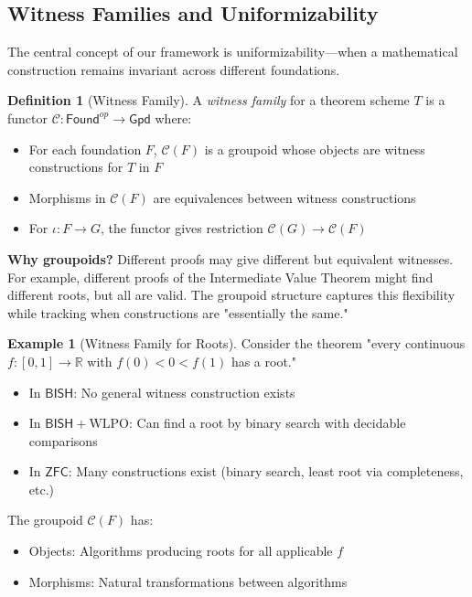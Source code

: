 \documentclass[11pt]{article}
\theoremstyle{plain}
\theoremstyle{definition}
\newtheorem{definition}[theorem]{Definition}
\newtheorem{example}[theorem]{Example}
\newcommand{\R}{\mathbb{R}}
\newcommand{\WLPO}{\mathrm{WLPO}}
\newcommand{\BISH}{\mathsf{BISH}}
\newcommand{\ZFC}{\mathsf{ZFC}}
\newcommand{\Found}{\mathsf{Found}}
\newcommand{\Gpd}{\mathsf{Gpd}}
\begin{document}
\subsection{Witness Families and Uniformizability}

The central concept of our framework is uniformizability—when a mathematical construction remains invariant across different foundations.

\begin{definition}[Witness Family]\label{def:witness-family}
A \emph{witness family} for a theorem scheme $T$ is a functor $\mathcal{C}: \Found^{op} \to \Gpd$ where:
\begin{itemize}
\item For each foundation $F$, $\mathcal{C}(F)$ is a groupoid whose objects are witness constructions for $T$ in $F$
\item Morphisms in $\mathcal{C}(F)$ are equivalences between witness constructions
\item For $\iota: F \to G$, the functor gives restriction $\mathcal{C}(G) \to \mathcal{C}(F)$
\end{itemize}
\end{definition}

\begin{intuitionbox}
\textbf{Why groupoids?} Different proofs may give different but equivalent witnesses. For example, different proofs of the Intermediate Value Theorem might find different roots, but all are valid. The groupoid structure captures this flexibility while tracking when constructions are "essentially the same."
\end{intuitionbox}

\begin{example}[Witness Family for Roots]
Consider the theorem "every continuous $f: [0,1] \to \R$ with $f(0) < 0 < f(1)$ has a root."
\begin{itemize}
\item In $\BISH$: No general witness construction exists
\item In $\BISH + \WLPO$: Can find a root by binary search with decidable comparisons
\item In $\ZFC$: Many constructions exist (binary search, least root via completeness, etc.)
\end{itemize}
The groupoid $\mathcal{C}(F)$ has:
\begin{itemize}
\item Objects: Algorithms producing roots for all applicable $f$
\item Morphisms: Natural transformations between algorithms
\end{itemize}
\end{example}
\end{document}
